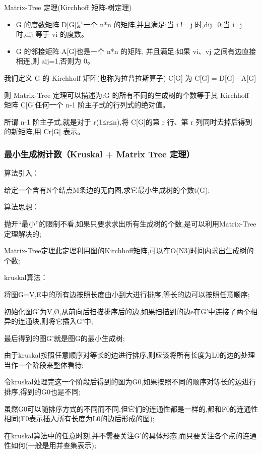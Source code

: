 Matrix-Tree 定理(Kirchhoff 矩阵-树定理)

\begin{itemize}
    \item G 的度数矩阵 D[G]是一个 n*n 的矩阵,并且满足:当 i != j 时,dij=0;当 i=j 时,dij 等于 vi 的度数。
    \item G 的邻接矩阵 A[G]也是一个 n*n 的矩阵, 并且满足:如果 vi、vj 之间有边直接相连,则 aij=1,否则为 0。
\end{itemize}

我们定义 G 的 Kirchhoff 矩阵(也称为拉普拉斯算子) C[G] 为 C[G] = D[G] - A[G]

则 Matrix-Tree 定理可以描述为:G 的所有不同的生成树的个数等于其 Kirchhoff 矩阵 C[G]任何一个 n-1 阶主子式的行列式的绝对值。

所谓 n-1 阶主子式,就是对于 r(1≤r≤n),将 C[G]的第 r 行、第 r 列同时去掉后得到的新矩阵,用 Cr[G] 表示。

\subsubsection{最小生成树计数（Kruskal + Matrix Tree 定理）}

算法引入：

给定一个含有N个结点M条边的无向图,求它最小生成树的个数t(G);

算法思想：

抛开“最小”的限制不看,如果只要求求出所有生成树的个数,是可以利用Matrix-Tree定理解决的;

Matrix-Tree定理此定理利用图的Kirchhoff矩阵,可以在O(N3)时间内求出生成树的个数;

kruskal算法：

将图G={V,E}中的所有边按照长度由小到大进行排序,等长的边可以按照任意顺序;

初始化图G’为{V,Ø},从前向后扫描排序后的边,如果扫描到的边e在G’中连接了两个相异的连通块,则将它插入G’中;

最后得到的图G’就是图G的最小生成树;

由于kruskal按照任意顺序对等长的边进行排序,则应该将所有长度为L0的边的处理当作一个阶段来整体看待;

令kruskal处理完这一个阶段后得到的图为G0,如果按照不同的顺序对等长的边进行排序,得到的G0也是不同;

虽然G0可以随排序方式的不同而不同,但它们的连通性都是一样的,都和F0的连通性相同(F0表示插入所有长度为L0的边后形成的图);

在kruskal算法中的任意时刻,并不需要关注G’的具体形态,而只要关注各个点的连通性如何(一般是用并查集表示);

